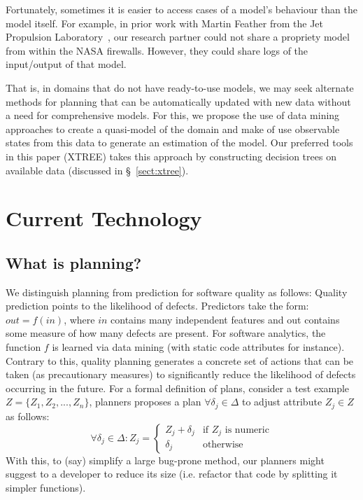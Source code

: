 \documentclass[sigconf, proceedings, 9pt]{acmart}
\newcommand{\tion}[1]{\S~\ref{sect:#1}}
\begin{document}
Fortunately, sometimes  it is easier to access cases of a model's behaviour 
than the model itself. For example, in prior work with Martin  Feather from the 
Jet Propulsion Laboratory~\cite{fea02a},  our research partner could not share 
a propriety model from within the NASA firewalls. However, they could share 
logs of the input/output of that model.

That is, in domains that do not have ready-to-use models, we may seek alternate 
methods for planning that can be automatically updated with new data without a 
need for comprehensive models. For this, we propose the use of data mining 
approaches to create a quasi-model of the domain and make of use observable 
states from this data to generate an estimation of the model. Our preferred 
tools in this paper (XTREE) takes this approach by constructing decision trees 
on available data (discussed in \tion{xtree}).

\section{Current Technology}
\subsection{What is planning?}
We distinguish planning from prediction for software quality as follows: 
Quality prediction points to the likelihood of defects. Predictors take the 
form: $out = f(in)$, 
where $in$ contains many independent features and out contains some measure of
how many defects are present. For software analytics, the function $f$ is 
learned via data mining (with static code attributes for instance). Contrary to 
this, quality planning generates a concrete set of actions that can be taken 
(as precautionary measures) to significantly reduce the likelihood of defects 
occurring in the future. For a formal definition of plans, consider a test 
example $Z=\{Z_1, Z_2, ..., Z_n\}$, planners
proposes a plan $\forall \delta_j \in \Delta$ to adjust attribute $Z_j\in Z$ as 
follows:
{\small\[
	\forall \delta_j \in \Delta :  Z_j =  
	\begin{cases}
	Z_j + \delta_j& \text{if $Z_j$ is numeric}\\
	\delta_j              & \text{otherwise}
	\end{cases}
	\]}
With this, to (say) simplify a large bug-prone method, our planners
might suggest to a developer to reduce its size (i.e. refactor that
code by splitting it simpler functions).
\end{document}
